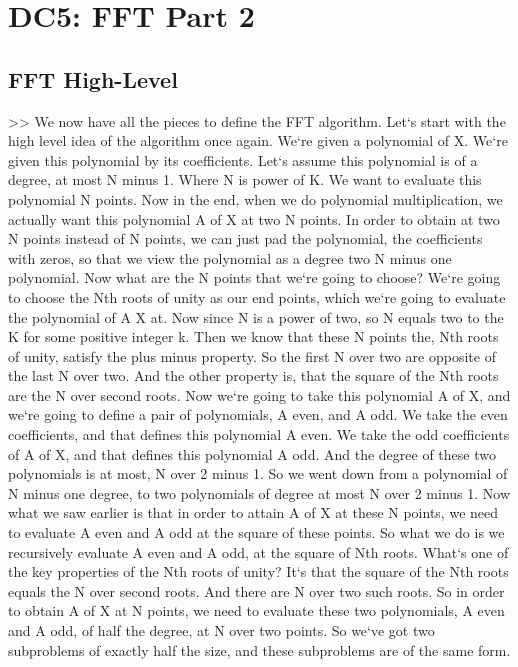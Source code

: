 \section{DC5: FFT   Part 2}

\subsection{FFT  High-Level}
\textgreater{}\textgreater{} We now have all the pieces to define the FFT algorithm.
Let`s start with the high level idea of the algorithm once again.
We`re given a polynomial of X\@.
We`re given this polynomial by its coefficients.
Let`s assume this polynomial is of a degree, at most N minus 1.
Where N is power of K\@.
We want to evaluate this polynomial N points.
Now in the end, when we do polynomial multiplication, we actually want this polynomial A of X at two N points.
In order to obtain at two N points instead of N points, we can just pad the polynomial, the coefficients with zeros, so that we view the polynomial as a degree two N minus one polynomial.
Now what are the N points that we`re going to choose? We`re going to choose the Nth roots of unity as our end points, which we`re going to evaluate the polynomial of A X at.
Now since N is a power of two, so N equals two to the K for some positive integer k.
Then we know that these N points the, Nth roots of unity, satisfy the plus minus property.
So the first N over two are opposite of the last N over two.
And the other property is, that the square of the Nth roots are the N over second roots.
Now we`re going to take this polynomial A of X, and we`re going to define a pair of polynomials, A even, and A odd.
We take the even coefficients, and that defines this polynomial A even.
We take the odd coefficients of A of X, and that defines this polynomial A odd.
And the degree of these two polynomials is at most, N over 2 minus 1.
So we went down from a polynomial of N minus one degree, to two polynomials of degree at most N over 2 minus 1.
Now what we saw earlier is that in order to attain A of X at these N points, we need to evaluate A even and A odd at the square of these points.
So what we do is we recursively evaluate A even and A odd, at the square of Nth roots.
What`s one of the key properties of the Nth roots of unity? It`s that the square of the Nth roots equals the N over second roots.
And there are N over two such roots.
So in order to obtain A of X at N points, we need to evaluate these two polynomials, A even and A odd, of half the degree, at N over two points.
So we`ve got two subproblems of exactly half the size, and these subproblems are of the same form.

